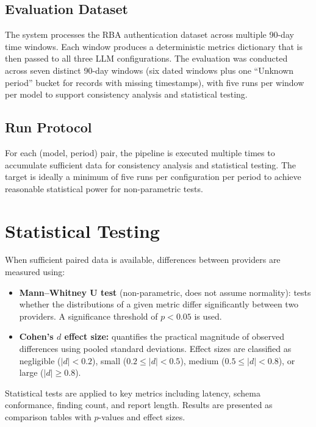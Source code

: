 \documentclass[]{UCD_CS_FYP_Report}
\begin{document}
\subsection{Evaluation Dataset}

The system processes the RBA authentication dataset across multiple 90-day time windows. Each window produces a deterministic metrics dictionary that is then passed to all three LLM configurations. The evaluation was conducted across seven distinct 90-day windows (six dated windows plus one ``Unknown period'' bucket for records with missing timestamps), with five runs per window per model to support consistency analysis and statistical testing.

\subsection{Run Protocol}

For each (model, period) pair, the pipeline is executed multiple times to accumulate sufficient data for consistency analysis and statistical testing. The target is ideally a minimum of five runs per configuration per period to achieve reasonable statistical power for non-parametric tests.

\section{Statistical Testing}
\label{sec:statistical_testing}

When sufficient paired data is available, differences between providers are measured using:

\begin{itemize}
    \item \textbf{Mann--Whitney U test} (non-parametric, does not assume normality): tests whether the distributions of a given metric differ significantly between two providers. A significance threshold of $p < 0.05$ is used.
    \item \textbf{Cohen's $d$ effect size:} quantifies the practical magnitude of observed differences using pooled standard deviations. Effect sizes are classified as negligible ($|d| < 0.2$), small ($0.2 \leq |d| < 0.5$), medium ($0.5 \leq |d| < 0.8$), or large ($|d| \geq 0.8$).
\end{itemize}

Statistical tests are applied to key metrics including latency, schema conformance, finding count, and report length. Results are presented as comparison tables with $p$-values and effect sizes.
\end{document}
